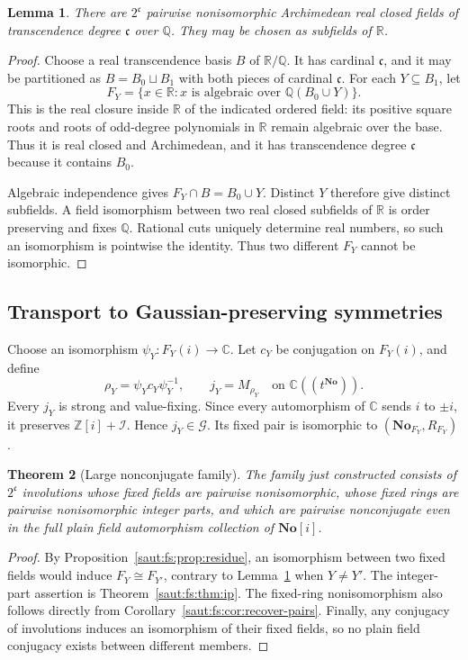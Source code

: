\documentclass[11pt]{article}
\newtheorem{theorem}{Theorem}[section]
\newtheorem{lemma}[theorem]{Lemma}
\theoremstyle{definition}
\theoremstyle{remark}
\newcommand{\No}{\mathbf{No}}
\newcommand{\R}{\mathbb R}
\newcommand{\C}{\mathbb C}
\newcommand{\Q}{\mathbb Q}
\newcommand{\Z}{\mathbb Z}
\newcommand{\cc}{\mathfrak c}
\newcommand{\Ineg}{\mathcal I}
\numberwithin{equation}{section}
\begin{document}
\begin{lemma}\label{saut:fs:lem:coefficient-family}
There are $2^{\cc}$ pairwise nonisomorphic Archimedean real closed fields of
transcendence degree $\cc$ over $\Q$. They may be chosen as subfields of $\R$.
\end{lemma}
\begin{proof}
Choose a real transcendence basis $B$ of $\R/\Q$. It has cardinal $\cc$, and it may be
partitioned as $B=B_0\sqcup B_1$ with both pieces of cardinal $\cc$. For each
$Y\subseteq B_1$, let
\begin{equation}\label{saut:fs:eq:FU}
 F_Y=\{x\in\R:x\text{ is algebraic over }\Q(B_0\cup Y)\}.
\end{equation}
This is the real closure inside $\R$ of the indicated ordered field: its positive
square roots and roots of odd-degree polynomials in $\R$ remain algebraic over the
base. Thus it is real closed and Archimedean, and it has transcendence degree $\cc$
because it contains $B_0$.

Algebraic independence gives $F_Y\cap B=B_0\cup Y$. Distinct $Y$ therefore give
distinct subfields. A field isomorphism between two real closed subfields of $\R$ is
order preserving and fixes $\Q$. Rational cuts uniquely determine real numbers, so
such an isomorphism is pointwise the identity. Thus two different $F_Y$ cannot be
isomorphic.
\end{proof}

\subsection{Transport to Gaussian-preserving symmetries}

Choose an isomorphism $\psi_Y:F_Y(i)\to\C$. Let $c_Y$ be conjugation on $F_Y(i)$, and
define
\[
 \rho_Y=\psi_Yc_Y\psi_Y^{-1},\qquad
 j_Y=M_{\rho_Y}\quad\text{on }\C((t^{\No})).
\]
Every $j_Y$ is strong and value-fixing. Since every automorphism of $\C$ sends $i$ to
$\pm i$, it preserves $\Z[i]+\Ineg$. Hence $j_Y\in\mathcal G$. Its fixed pair is
isomorphic to $(\No_{F_Y},R_{F_Y})$.

\begin{theorem}[Large nonconjugate family]\label{saut:fs:thm:large-family}
The family just constructed consists of $2^{\cc}$ involutions whose fixed fields are
pairwise nonisomorphic, whose fixed rings are pairwise nonisomorphic integer parts,
and which are pairwise nonconjugate even in the full plain field automorphism
collection of $\No[i]$.
\end{theorem}
\begin{proof}
By Proposition~\ref{saut:fs:prop:residue}, an isomorphism between two fixed fields
would induce $F_Y\cong F_{Y'}$, contrary to Lemma~\ref{saut:fs:lem:coefficient-family}
when $Y\ne Y'$. The integer-part assertion is Theorem~\ref{saut:fs:thm:ip}. The
fixed-ring nonisomorphism also follows directly from
Corollary~\ref{saut:fs:cor:recover-pairs}. Finally, any conjugacy of involutions
induces an isomorphism of their fixed fields, so no plain field conjugacy exists
between different members.
\end{proof}
\end{document}
